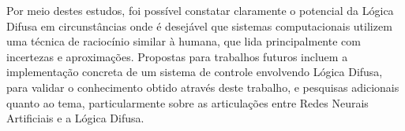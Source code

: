 \documentclass[12pt]{article}
\begin{document}
Por meio destes estudos, foi possível constatar claramente o potencial da Lógica Difusa em circunstâncias onde é desejável que sistemas computacionais utilizem uma técnica de raciocínio similar à humana, que lida principalmente com incertezas e aproximações. Propostas para trabalhos futuros incluem a implementação concreta de um sistema de controle envolvendo Lógica Difusa, para validar o conhecimento obtido através deste trabalho, e pesquisas adicionais quanto ao tema, particularmente sobre as articulações entre Redes Neurais Artificiais e a Lógica Difusa.



\end{document}
